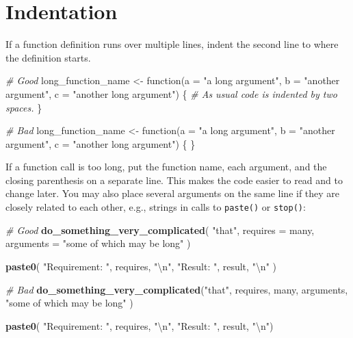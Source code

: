 \documentclass[]{book}
\newenvironment{Shaded}{\begin{snugshade}}{\end{snugshade}}
\newcommand{\KeywordTok}[1]{\textcolor[rgb]{0.13,0.29,0.53}{\textbf{{#1}}}}
\newcommand{\DataTypeTok}[1]{\textcolor[rgb]{0.13,0.29,0.53}{{#1}}}
\newcommand{\CharTok}[1]{\textcolor[rgb]{0.31,0.60,0.02}{{#1}}}
\newcommand{\StringTok}[1]{\textcolor[rgb]{0.31,0.60,0.02}{{#1}}}
\newcommand{\CommentTok}[1]{\textcolor[rgb]{0.56,0.35,0.01}{\textit{{#1}}}}
\newcommand{\NormalTok}[1]{{#1}}
\begin{document}
\section{Indentation}\label{indentation}

If a function definition runs over multiple lines, indent the second
line to where the definition starts.

\begin{Shaded}
\begin{Highlighting}[]
\CommentTok{# Good}
\NormalTok{long_function_name <-}\StringTok{ }\NormalTok{function(}\DataTypeTok{a =} \StringTok{"a long argument"}\NormalTok{, }
                               \DataTypeTok{b =} \StringTok{"another argument"}\NormalTok{,}
                               \DataTypeTok{c =} \StringTok{"another long argument"}\NormalTok{) \{}
  \CommentTok{# As usual code is indented by two spaces.}
\NormalTok{\}}

\CommentTok{# Bad}
\NormalTok{long_function_name <-}\StringTok{ }\NormalTok{function(}\DataTypeTok{a =} \StringTok{"a long argument"}\NormalTok{,}
  \DataTypeTok{b =} \StringTok{"another argument"}\NormalTok{,}
  \DataTypeTok{c =} \StringTok{"another long argument"}\NormalTok{) \{}
\NormalTok{\}}
\end{Highlighting}
\end{Shaded}

If a function call is too long, put the function name, each argument,
and the closing parenthesis on a separate line. This makes the code
easier to read and to change later. You may also place several arguments
on the same line if they are closely related to each other, e.g.,
strings in calls to \texttt{paste()} or \texttt{stop()}:

\begin{Shaded}
\begin{Highlighting}[]
\CommentTok{# Good}
\KeywordTok{do_something_very_complicated}\NormalTok{(}
  \StringTok{"that"}\NormalTok{,}
  \DataTypeTok{requires =} \NormalTok{many,}
  \DataTypeTok{arguments =} \StringTok{"some of which may be long"}
\NormalTok{)}

\KeywordTok{paste0}\NormalTok{(}
  \StringTok{"Requirement: "}\NormalTok{, requires, }\StringTok{"}\CharTok{\textbackslash{}n}\StringTok{"}\NormalTok{,}
  \StringTok{"Result: "}\NormalTok{, result, }\StringTok{"}\CharTok{\textbackslash{}n}\StringTok{"}
\NormalTok{)}

\CommentTok{# Bad}
\KeywordTok{do_something_very_complicated}\NormalTok{(}\StringTok{"that"}\NormalTok{, requires, many, arguments,}
                              \StringTok{"some of which may be long"}
                              \NormalTok{)}

\KeywordTok{paste0}\NormalTok{(}
  \StringTok{"Requirement: "}\NormalTok{, requires,}
  \StringTok{"}\CharTok{\textbackslash{}n}\StringTok{"}\NormalTok{, }\StringTok{"Result: "}\NormalTok{,}
  \NormalTok{result, }\StringTok{"}\CharTok{\textbackslash{}n}\StringTok{"}\NormalTok{)}
\end{Highlighting}
\end{Shaded}
\end{document}
